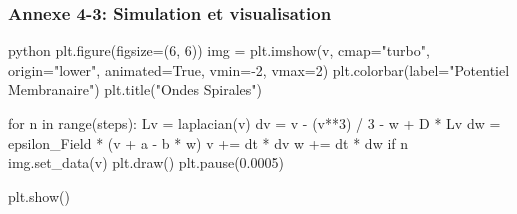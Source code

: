 \begin{frame}[fragile]
\frametitle{Annexe 4-3: Simulation et visualisation}
\begin{mintedbox}[fontsize=\footnotesize]{python}
plt.figure(figsize=(6, 6))
img = plt.imshow(v, cmap="turbo", origin="lower", animated=True, vmin=-2, vmax=2)
plt.colorbar(label="Potentiel Membranaire")
plt.title("Ondes Spirales")

for n in range(steps):
    Lv = laplacian(v)                     
    dv = v - (v**3) / 3 - w + D * Lv      
    dw = epsilon_Field * (v + a - b * w) 
    v += dt * dv
    w += dt * dw
    if n %
        img.set_data(v)          
        plt.draw()
        plt.pause(0.0005)

plt.show()
\end{mintedbox}
\end{frame}